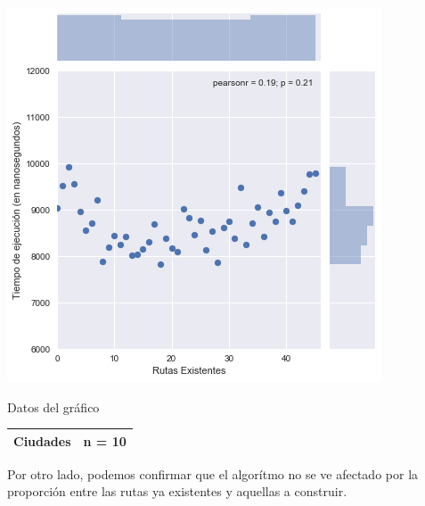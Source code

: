 \noindent
\begin{minipage}{0.55\textwidth}
	\hfill
	\includegraphics[scale=0.60]{imagenes/ej3-2.png}
\end{minipage}
\hfill
\begin{minipage}{0.44\textwidth}
	\begin{center}
		Datos del gráfico

		\begin{tabular}{ | l l |}
			\hline
			Ciudades & n = 10 \\
			\hline
		\end{tabular}
	\end{center}
\end{minipage}

Por otro lado, podemos confirmar que el algorítmo no se ve afectado por la proporción entre las rutas ya existentes y aquellas a construir.
